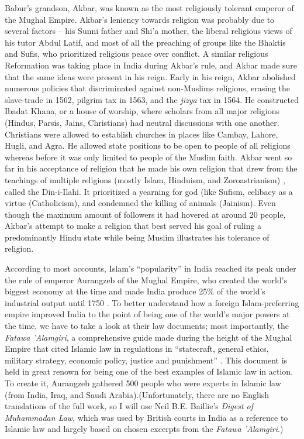 \documentclass[11pt, letterpaper]{article}
\begin{document}
Babur's grandson, Akbar, was known as the most religiously tolerant
emperor of the Mughal Empire. Akbar's leniency towards religion was
probably due to several factors -- his Sunni father and Shi'a mother,
the liberal religious views of his tutor Abdul Latif, and most of all
the preaching of groups like the Bhaktis and Sufis, who prioritized
religious peace over conflict. A similar religious Reformation was
taking place in India during Akbar's rule, and Akbar made sure that the
same ideas were present in his reign. Early in his reign, Akbar
abolished numerous policies that discriminated against non-Muslims
religions, erasing the slave-trade in 1562, pilgrim tax in 1563, and the
\emph{jizya} tax in 1564. He constructed Ibadat Khana, or a house of
worship, where scholars from all major religions (Hindus, Parsis, Jains,
Christians) had neutral discussions with one another. Christians were
allowed to establish churches in places like Cambay, Lahore, Hugli, and
Agra. He allowed state positions to be open to people of all religions
whereas before it was only limited to people of the Muslim faith. Akbar
went so far in his acceptance of religion that he made his own religion
that drew from the teachings of multiple religions (mostly Islam,
Hinduism, and Zoroastrianism) , called the Din-i-Ilahi. It prioritized a
yearning for god (like Sufism, celibacy as a virtue (Catholicism), and
condemned the killing of animals (Jainism). Even though the maximum
amount of followers it had hovered at around 20 people, Akbar's attempt
to make a religion that best served his goal of ruling a predominantly
Hindu state while being Muslim illustrates his tolerance of religion.

According to most accounts, Islam's ``popularity'' in India reached
its peak under the rule of emperor Aurangzeb of the Mughal Empire, who
created the world's biggest economy at the time and made India produce
25\% of the world's industrial output until 1750 \cite{partha}. To
better understand how a foreign Islam-preferring empire improved India
to the point of being one of the world's major powers at the time, we
have to take a look at their law documents; most importantly, the
\emph{Fatawa 'Alamgiri}, a comprehensive guide made during the height of
the Mughal Empire that cited Islamic law in regulations in ``statecraft,
general ethics, military strategy, economic policy, justice and
punishment'' \cite{malik}. This document is held in great renown for being
one of the best examples of Islamic law in action. To create it,
Aurangzeb gathered 500 people who were experts in Islamic law (from
India, Iraq, and Saudi Arabia).(Unfortunately, there are no English
translations of the full work, so I will use Neil B.E. Baillie's
\emph{Digest of Muhammadan Law}, which was used by British courts in
India as a reference to Islamic law and largely based on chosen excerpts
from the \emph{Fatawa 'Alamgiri}.)
\end{document}

